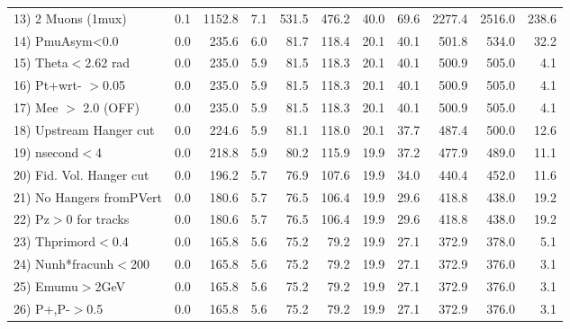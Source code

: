\begin{table}[h!]
{{\begin{tabular}{||l||r|r|r|r|r|r|r||r||r||r||}
 13) 2 Muons (1mux)       &       0.1 &    1152.8 &       7.1 &     531.5 &     476.2 &      40.0 &      69.6 &    2277.4 &    2516.0 &     238.6 \\
 14) PmuAsym<0.0          &       0.0 &     235.6 &       6.0 &      81.7 &     118.4 &      20.1 &      40.1 &     501.8 &     534.0 &      32.2 \\
 15) Theta$<$2.62 rad     &       0.0 &     235.0 &       5.9 &      81.5 &     118.3 &      20.1 &      40.1 &     500.9 &     505.0 &       4.1 \\
 16) Pt+wrt- $>$0.05      &       0.0 &     235.0 &       5.9 &      81.5 &     118.3 &      20.1 &      40.1 &     500.9 &     505.0 &       4.1 \\
 17) Mee $>$ 2.0  (OFF)   &       0.0 &     235.0 &       5.9 &      81.5 &     118.3 &      20.1 &      40.1 &     500.9 &     505.0 &       4.1 \\
 18) Upstream Hanger cut  &       0.0 &     224.6 &       5.9 &      81.1 &     118.0 &      20.1 &      37.7 &     487.4 &     500.0 &      12.6 \\
 19) nsecond$<$4          &       0.0 &     218.8 &       5.9 &      80.2 &     115.9 &      19.9 &      37.2 &     477.9 &     489.0 &      11.1 \\
 20) Fid. Vol. Hanger cut &       0.0 &     196.2 &       5.7 &      76.9 &     107.6 &      19.9 &      34.0 &     440.4 &     452.0 &      11.6 \\
 21) No Hangers fromPVert &       0.0 &     180.6 &       5.7 &      76.5 &     106.4 &      19.9 &      29.6 &     418.8 &     438.0 &      19.2 \\
 22) Pz$>$0 for tracks    &       0.0 &     180.6 &       5.7 &      76.5 &     106.4 &      19.9 &      29.6 &     418.8 &     438.0 &      19.2 \\
 23) Thprimord$<$0.4      &       0.0 &     165.8 &       5.6 &      75.2 &      79.2 &      19.9 &      27.1 &     372.9 &     378.0 &       5.1 \\
 24) Nunh*fracunh$<$200   &       0.0 &     165.8 &       5.6 &      75.2 &      79.2 &      19.9 &      27.1 &     372.9 &     376.0 &       3.1 \\
 25) Emumu$>$2GeV         &       0.0 &     165.8 &       5.6 &      75.2 &      79.2 &      19.9 &      27.1 &     372.9 &     376.0 &       3.1 \\
 26) P+,P-$>$0.5          &       0.0 &     165.8 &       5.6 &      75.2 &      79.2 &      19.9 &      27.1 &     372.9 &     376.0 &       3.1 \\

\end{tabular}}}
\end{table}
